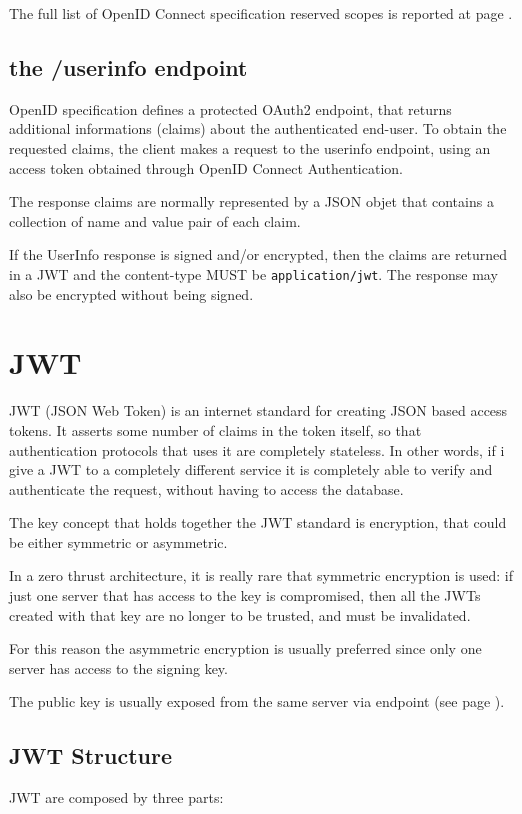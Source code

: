 \documentclass[11pt]{style}
\begin{document}
The full list of OpenID Connect specification reserved scopes is reported at
page \pageref{openid}.

\subsection{the /userinfo endpoint}
OpenID specification defines a protected OAuth2 endpoint, that returns
additional informations (claims) about the authenticated end-user.
To obtain the requested claims, the client makes a request to the userinfo
endpoint, using an access token obtained through OpenID Connect
Authentication.

The response claims are normally represented by a JSON objet that contains a
collection of name and value pair of each claim.

If the UserInfo response is signed and/or encrypted, then the claims are
returned in a JWT and the content-type MUST be \texttt{application/jwt}.
The response may also be encrypted without being signed.


\section{JWT}
\label{jwt}
JWT (JSON Web Token) is an internet standard for creating JSON based access tokens.
It asserts some number of claims in the token itself, so that authentication
protocols that uses it are completely stateless.
In other words, if i give a JWT to a completely different service it is
completely able to verify and authenticate the request, without having to access
the database.

The key concept that holds together the JWT standard is encryption, that could
be either symmetric or asymmetric.

In a zero thrust architecture, it is really rare that symmetric encryption is
used: if just one server that has access to the key is compromised, then all the
JWTs created with that key are no longer to be trusted, and must be invalidated.

For this reason the asymmetric encryption is usually preferred since only one
server has access to the signing key.

The public key is usually exposed from the same server via endpoint (see page
\pageref{jwks}).

\subsection{JWT Structure}
JWT are composed by three  parts:
\end{document}
